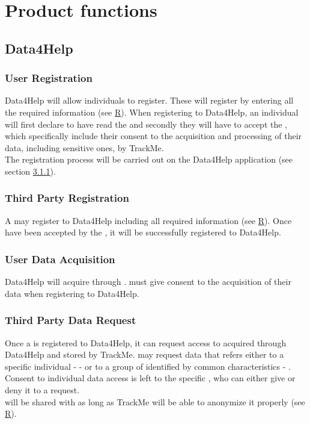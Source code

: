 \documentclass[../../rasd.tex]{subfiles}
\begin{document}
\section{Product functions}

	\subsection{Data4Help}
	
		\subsubsection{User Registration}
		Data4Help will allow individuals to register. These will register by entering all the required information (see \hyperref[sect:3.2.5]{R}). When registering to Data4Help, an individual will first declare to have read the  and secondly they will have to accept the , which specifically include their consent to the acquisition and processing of their data, including sensitive ones, by TrackMe.\\
		The  registration process will be carried out on the Data4Help application (see section \hyperref[sect:3.1.1]{3.1.1}).

		\subsubsection{Third Party Registration}
		A  may register to Data4Help including all required information (see \hyperref[sect:3.2.5]{R}).
		Once  have been accepted by the , it will be successfully registered to Data4Help.

		\subsubsection{User Data Acquisition}
		Data4Help will acquire  through .  must give consent to the acquisition of their data when registering to Data4Help.\\

		\subsubsection{Third Party Data Request}
		Once a  is registered to Data4Help, it can request access to  acquired through Data4Help and stored by TrackMe.  may request data that refers either to a specific individual -  - or to a group of  identified by common characteristics - .\\
		Consent to individual data access is left to the specific , who can either give or deny it to a  request.\\
		 will be shared with  as long as TrackMe will be able to anonymize it properly (see \hyperref[sect:3.2.5]{R}).
\end{document}
